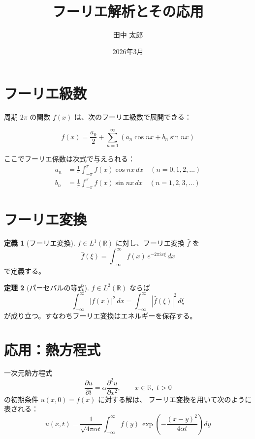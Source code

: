 \documentclass[11pt]{article}
\title{フーリエ解析とその応用}
\author{田中 太郎}
\date{2026年3月}
\theoremstyle{definition}
\newtheorem{theorem}{定理}
\newtheorem{definition}[theorem]{定義}
\begin{document}
\maketitle

\section{フーリエ級数}

周期 $2\pi$ の関数 $f(x)$ は、次のフーリエ級数で展開できる：

\begin{equation}
  f(x) = \frac{a_0}{2} + \sum_{n=1}^{\infty}
  \left( a_n \cos nx + b_n \sin nx \right)
\end{equation}

ここでフーリエ係数は次式で与えられる：
\begin{align}
  a_n & = \frac{1}{\pi} \int_{-\pi}^{\pi} f(x) \cos nx \, dx
  \quad (n = 0, 1, 2, \ldots)                                \\
  b_n & = \frac{1}{\pi} \int_{-\pi}^{\pi} f(x) \sin nx \, dx
  \quad (n = 1, 2, 3, \ldots)
\end{align}

\section{フーリエ変換}

\begin{definition}[フーリエ変換]
  $f \in L^1(\mathbb{R})$ に対し、フーリエ変換 $\hat{f}$ を
  \begin{equation}
    \hat{f}(\xi) = \int_{-\infty}^{\infty}
    f(x)\, e^{-2\pi i x \xi} \, dx
  \end{equation}
  で定義する。
\end{definition}

\begin{theorem}[パーセバルの等式]
  $f \in L^2(\mathbb{R})$ ならば
  \begin{equation}
    \int_{-\infty}^{\infty} |f(x)|^2 \, dx
    = \int_{-\infty}^{\infty} |\hat{f}(\xi)|^2 \, d\xi
  \end{equation}
  が成り立つ。すなわちフーリエ変換はエネルギーを保存する。
\end{theorem}

\section{応用：熱方程式}

一次元熱方程式
\begin{equation}
  \frac{\partial u}{\partial t}
  = \alpha \frac{\partial^2 u}{\partial x^2},
  \qquad x \in \mathbb{R},\; t > 0
\end{equation}
の初期条件 $u(x,0) = f(x)$ に対する解は、
フーリエ変換を用いて次のように表される：
\begin{equation}
  u(x,t) = \frac{1}{\sqrt{4\pi\alpha t}}
  \int_{-\infty}^{\infty}
  f(y)\, \exp\!\left( -\frac{(x-y)^2}{4\alpha t} \right) dy
\end{equation}
\end{document}
